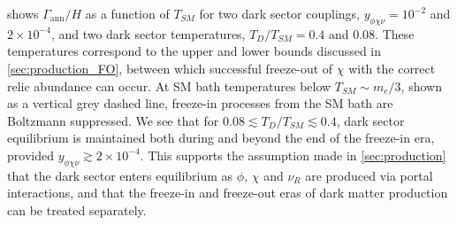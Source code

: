 \documentclass[aps, prd, reprint, nofootinbib, amsmath, amssymb, floatfix]{revtex4-2}
\begin{document}
 shows $\Gamma_{\mathrm{ann}}/H$ as a function of $T_{SM}$ for two dark sector couplings, $y_{\phi\chi\nu} = 10^{-2}$ and $2\times 10^{-4}$, and two dark sector temperatures, $T_D/T_{SM} = 0.4$ and 0.08. These temperatures correspond to the upper and lower bounds discussed in \cref{sec:production_FO}, between which successful freeze-out of $\chi$ with the correct relic abundance can occur. At SM bath temperatures below $T_{SM} \sim m_e/3$, shown as a vertical grey dashed line, freeze-in processes from the SM bath are Boltzmann suppressed. We see that for $0.08 \lesssim T_D/T_{SM} \lesssim 0.4$, dark sector equilibrium is maintained both during and beyond the end of the freeze-in era, provided $y_{\phi\chi\nu} \gtrsim 2\times 10^{-4}$. This supports the assumption made in \cref{sec:production} that the dark sector enters equilibrium as $\phi$, $\chi$ and $\nu_R$ are produced via portal interactions, and that the freeze-in and freeze-out eras of dark matter production can be treated separately. 
  



\end{document}
